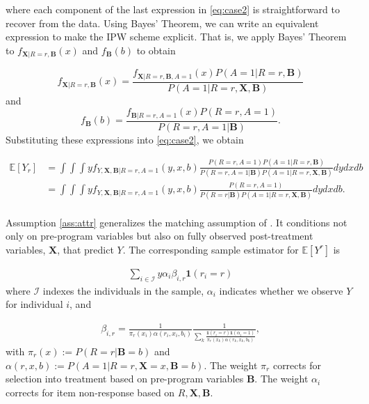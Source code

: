 \noindent where each component of the last expression in \eqref{eq:case2} is straightforward to recover from the data. Using Bayes' Theorem, we can write an equivalent expression to make the IPW scheme explicit. That is, we apply Bayes' Theorem to $f_{\bm{X} | R=r, \bm{B} }(x)$ and $f_{\bm{B}} (b)$ to obtain

\begin{equation*}
f_{\bm{X}|R=r,\bm{B}}(x) = \frac{f_{\bm{X}|R=r,\bm{B},A=1}(x) P(A=1|R=r,\bm{B})}{P(A=1|R=r,\bm{X},\bm{B})}
\end{equation*}
and
\begin{equation*}
	f_{\bm{B}} (b) = \frac{f_{\bm{B}|R=r,A=1} (x) P(R=r,A=1)}{P(R=r,A=1|\bm{B})}.
\end{equation*}
\noindent Substituting these expressions into \eqref{eq:case2}, we obtain

\begin{align*} \label{eq:case2ipw}
\mathbb{E}[Y_r] & = \int \int \int y f_{Y,\bm{X},\bm{B}|R=r,A=1}(y,x,b) \frac{P(R=r,A=1) P(A=1|R=r,\bm{B})}{P(R=r,A=1|\bm{B}) P(A=1|R=r,\bm{X},\bm{B})} dydxdb \\
	            & = \int \int  \int y f_{Y,\bm{X},\bm{B}|R=r,A=1}(y,x,b) \frac{P(R=r,A=1)}{P(R=r|\bm{B}) P(A=1|R=r,\bm{X},\bm{B})} dydxdb. \\
\end{align*}

\noindent Assumption \ref{ass:attr} generalizes the matching assumption of \citet{Campbell_Conti_etal_2014_EarlyChildhoodInvestments}. It conditions not only on pre-program variables but also on fully observed post-treatment variables, $\bm{X}$, that predict $Y$. The corresponding sample estimator for $\mathbb{E}[Y^r]$ is

\begin{align*}
\sum_{i \in \mathcal{I}} y \alpha_{i} \beta_{i,r} \mathbf{1}(r_i = r)
\end{align*}
\noindent where $\mathcal{I}$ indexes the individuals in the sample, $\alpha_i$ indicates whether we observe $Y$ for individual $i$, and

\begin{align*}
	\beta_{i,r} = \frac{1}{\pi_r(x_i) \alpha(r_i,x_i,b_i)} \frac{1}{\sum_k{\frac{\mathbf{1}(r_i = r) \mathbf{1}(\alpha_i = 1)}{\pi_r(x_k)\alpha(r_k,x_k,b_k)}}},
\end{align*}
\noindent with $\pi_r(x) := P(R=r|\bm{B}=b)$ and $\alpha(r,x,b) := P(A=1|R=r,\bm{X}=x,\bm{B}=b)$. The weight $\pi_r$ corrects for selection into treatment based on pre-program variables $\bm{B}$. The weight $\alpha_{i}$ corrects for item non-response based on $R, \bm{X}, \bm{B}$.\\

